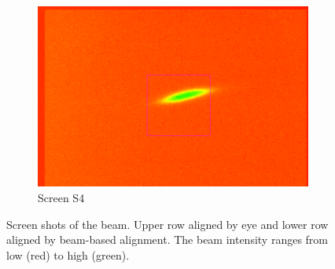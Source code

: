 \documentclass[11pt,a4paper,notitlepage]{scrartcl}
\begin{document}
\begin{figure}[htbp]
\begin{subfigure}{0.19\linewidth}
		\includegraphics[width=\linewidth]{figs/Screens/S4_Calib.png}
		\caption{Screen S4}\label{fig:ScreenS4}
	\end{subfigure}	
	\caption{Screen shots of the beam. Upper row aligned by eye and lower row aligned by beam-based alignment. The beam intensity ranges from low (red) to high (green).}\label{fig:Screenshots}
\end{figure}
\end{document}
